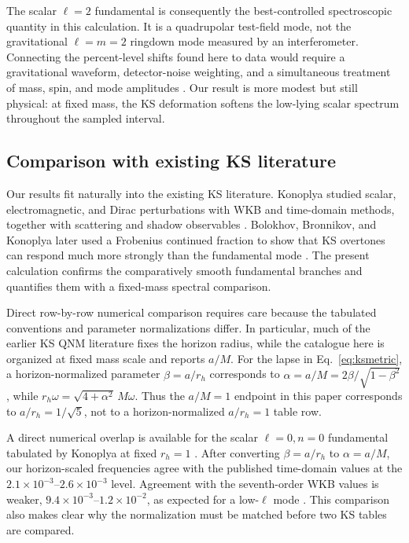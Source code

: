 \documentclass[12pt,a4paper]{article}
\begin{document}
\color{blue}
The scalar \(\ell=2\) fundamental is consequently the best-controlled
spectroscopic quantity in this calculation. It is a quadrupolar test-field
mode, not the gravitational \(\ell=m=2\) ringdown mode measured by an
interferometer. Connecting the percent-level shifts found here to data would
require a gravitational waveform, detector-noise weighting, and a simultaneous
treatment of mass, spin, and mode amplitudes \cite{Berti2006,Isi2019}. Our
result is more modest but still physical: at fixed mass, the KS deformation
softens the low-lying scalar spectrum throughout the sampled interval.
\color{black}

\subsection{Comparison with existing KS literature}

\color{blue}
Our results fit naturally into the existing KS literature. Konoplya studied
scalar, electromagnetic, and Dirac perturbations with WKB and time-domain
methods, together with scattering and shadow observables \cite{Konoplya2020}.
Bolokhov, Bronnikov, and Konoplya later used a Frobenius continued fraction to
show that KS overtones can respond much more strongly than the fundamental
mode \cite{Bolokhov2025}. The present calculation confirms the comparatively
smooth fundamental branches and quantifies them with a fixed-mass spectral
comparison.
\color{black}

Direct row-by-row numerical comparison requires care because the tabulated conventions and parameter normalizations differ. In particular, much of the earlier KS QNM literature fixes the horizon radius, while the catalogue here is organized at fixed mass scale and reports \(a/M\). For the lapse in Eq.~\eqref{eq:ksmetric}, a horizon-normalized parameter \(\beta=a/r_h\) corresponds to \(\alpha=a/M=2\beta/\sqrt{1-\beta^2}\), while \(r_h\omega=\sqrt{4+\alpha^2}\,M\omega\). Thus the \(a/M=1\) endpoint in this paper corresponds to \(a/r_h=1/\sqrt{5}\), not to a horizon-normalized \(a/r_h=1\) table row.

\color{blue}
A direct numerical overlap is available for the scalar \(\ell=0,n=0\)
fundamental tabulated by Konoplya at fixed \(r_h=1\) \cite{Konoplya2020}.
After converting \(\beta=a/r_h\) to \(\alpha=a/M\), our horizon-scaled
frequencies agree with the published time-domain values at the
\(2.1\times10^{-3}\)--\(2.6\times10^{-3}\) level. Agreement with the
seventh-order WKB values is weaker, \(9.4\times10^{-3}\)--\(1.2\times10^{-2}\),
as expected for a low-\(\ell\) mode \cite{Konoplya2003,Konoplya2011}. This
comparison also makes clear why the normalization must be matched before two
KS tables are compared.
\color{black}
\end{document}
